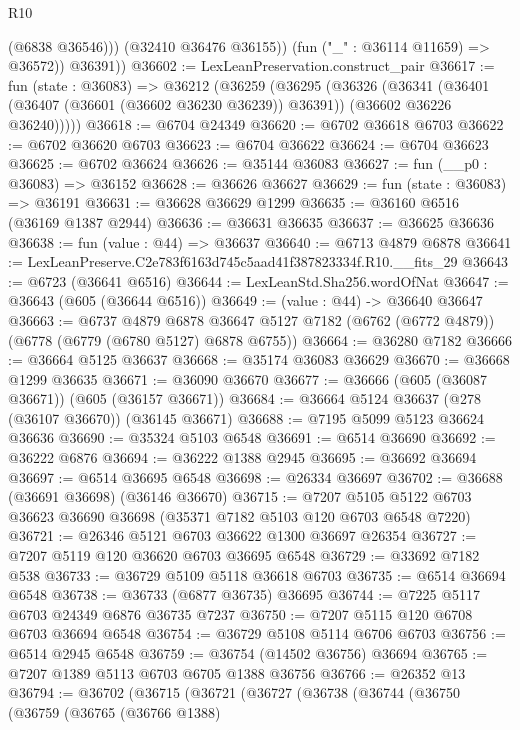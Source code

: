 \begin{lexlean}{R10}
\begin{coremodule}
                (@6838 @36546)))
            (@32410 @36476 @36155))
          (fun ("_" : @36114 @11659) => @36572))
        @36391))
@36602 := LexLeanPreservation.construct_pair
@36617 := fun (state : @36083) =>
  @36212
    (@36259
      (@36295
        (@36326
          (@36341
            (@36401 (@36407 (@36601 (@36602 @36230 @36239)) @36391))
            (@36602 @36226 @36240)))))
@36618 := @6704 @24349
@36620 := @6702 @36618 @6703
@36622 := @6702 @36620 @6703
@36623 := @6704 @36622
@36624 := @6704 @36623
@36625 := @6702 @36624
@36626 := @35144 @36083
@36627 := fun (__p0 : @36083) => @36152
@36628 := @36626 @36627
@36629 := fun (state : @36083) => @36191
@36631 := @36628 @36629 @1299
@36635 := @36160 @6516 (@36169 @1387 @2944)
@36636 := @36631 @36635
@36637 := @36625 @36636
@36638 := fun (value : @44) => @36637
@36640 := @6713 @4879 @6878
@36641 := LexLeanPreserve.C2e783f6163d745c5aad41f387823334f.R10.__fits_29
@36643 := @6723 (@36641 @6516)
@36644 := LexLeanStd.Sha256.wordOfNat
@36647 := @36643 (@605 (@36644 @6516))
@36649 := (value : @44) -> @36640 @36647
@36663 := @6737
    @4879
    @6878
    @36647
    @5127
    @7182
    (@6762 (@6772 @4879))
    (@6778 (@6779 (@6780 @5127) @6878 @6755))
@36664 := @36280 @7182
@36666 := @36664 @5125 @36637
@36668 := @35174 @36083 @36629
@36670 := @36668 @1299 @36635
@36671 := @36090 @36670
@36677 := @36666 (@605 (@36087 @36671)) (@605 (@36157 @36671))
@36684 := @36664 @5124 @36637 (@278 (@36107 @36670)) (@36145 @36671)
@36688 := @7195 @5099 @5123 @36624 @36636
@36690 := @35324 @5103 @6548
@36691 := @6514 @36690
@36692 := @36222 @6876
@36694 := @36222 @1388 @2945
@36695 := @36692 @36694
@36697 := @6514 @36695 @6548
@36698 := @26334 @36697
@36702 := @36688 (@36691 @36698) (@36146 @36670)
@36715 := @7207 @5105 @5122 @6703 @36623 @36690 @36698 (@35371 @7182 @5103 @120 @6703 @6548 @7220)
@36721 := @26346 @5121 @6703 @36622 @1300 @36697 @26354
@36727 := @7207 @5119 @120 @36620 @6703 @36695 @6548
@36729 := @33692 @7182 @538
@36733 := @36729 @5109 @5118 @36618 @6703
@36735 := @6514 @36694 @6548
@36738 := @36733 (@6877 @36735) @36695
@36744 := @7225 @5117 @6703 @24349 @6876 @36735 @7237
@36750 := @7207 @5115 @120 @6708 @6703 @36694 @6548
@36754 := @36729 @5108 @5114 @6706 @6703
@36756 := @6514 @2945 @6548
@36759 := @36754 (@14502 @36756) @36694
@36765 := @7207 @1389 @5113 @6703 @6705 @1388 @36756
@36766 := @26352 @13
@36794 := @36702
    (@36715
      (@36721
        (@36727
          (@36738
            (@36744
              (@36750
                (@36759
                  (@36765
                    (@36766 @1388)

\end{coremodule}
\end{lexlean}

